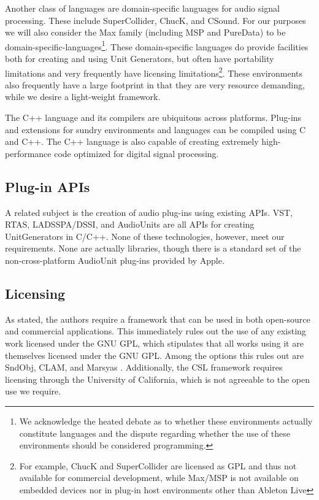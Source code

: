 \documentclass[twoside,10pt]{article}
\begin{document}
Another class of languages are domain-specific languages for audio signal processing.  These include SuperCollider\cite{McCartney:1996}, ChucK\cite{wang:2008}, and CSound.  For our purposes we will also consider the Max family (including MSP\cite{Zicarelli:1998} and PureData\cite{Puckette:1996}) to be domain-specific-languages\footnote{We acknowledge the heated debate as to whether these environments actually constitute languages and the dispute regarding whether the use of these environments should be considered programming.}.  These domain-specific languages do provide facilities both for creating and using Unit Generators, but often have portability limitations and very frequently have licensing limitations\footnote{For example, ChucK and SuperCollider are licensed as GPL and thus not available for commercial development, while Max/MSP is not available on embedded devices nor in plug-in host environments other than Ableton Live}.  These environments also frequently have a large footprint in that they are very resource demanding, while we desire a light-weight framework.

The C++ language and its compilers are ubiquitous across platforms.  Plug-ins and extensions for sundry environments and languages can be compiled using C and C++.  The C++ language is also capable of creating extremely high-performance code optimized for digital signal processing.



\subsection{Plug-in APIs} %

A related subject is the creation of audio plug-ins using existing APIs.  VST, RTAS, LADSSPA/DSSI, and AudioUnits are all APIs for creating UnitGenerators in C/C++.  None of these technologies, however, meet our requirements.  None are actually libraries, though there is a standard set of the non-cross-platform AudioUnit plug-ins provided by Apple.



\subsection{Licensing} %

As stated, the authors require a framework that can be used in both open-source and commercial applications.  This immediately rules out the use of any existing work licensed under the GNU GPL, which stipulates that all works using it are themselves licensed under the GNU GPL.  Among the options this rules out are SndObj\cite{Lazzarini:2001}, CLAM\cite{Amatraian:2008}, and Marsyas \cite{Tzanetakis:2008}.  Additionally, the CSL framework\cite{Pope:2003} requires licensing through the University of California, which is not agreeable to the open use we require.
\end{document}
